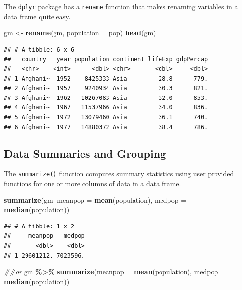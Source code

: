 \documentclass[
]{krantz}
\newenvironment{Shaded}{\begin{snugshade}}{\end{snugshade}}
\newcommand{\CommentTok}[1]{\textcolor[rgb]{0.56,0.35,0.01}{\textit{#1}}}
\newcommand{\DataTypeTok}[1]{\textcolor[rgb]{0.13,0.29,0.53}{#1}}
\newcommand{\KeywordTok}[1]{\textcolor[rgb]{0.13,0.29,0.53}{\textbf{#1}}}
\newcommand{\NormalTok}[1]{#1}
\newcommand{\OperatorTok}[1]{\textcolor[rgb]{0.81,0.36,0.00}{\textbf{#1}}}
\newcommand{\StringTok}[1]{\textcolor[rgb]{0.31,0.60,0.02}{#1}}
\begin{document}
The \texttt{dplyr} package has a \texttt{rename} function that makes renaming variables in a data frame quite easy.

\begin{Shaded}
\begin{Highlighting}[]
\NormalTok{gm \textless{}{-}}\StringTok{ }\KeywordTok{rename}\NormalTok{(gm, }\DataTypeTok{population =}\NormalTok{ pop)}
\KeywordTok{head}\NormalTok{(gm)}
\end{Highlighting}
\end{Shaded}

\begin{verbatim}
## # A tibble: 6 x 6
##   country   year population continent lifeExp gdpPercap
##   <chr>    <int>      <dbl> <chr>       <dbl>     <dbl>
## 1 Afghani~  1952    8425333 Asia         28.8      779.
## 2 Afghani~  1957    9240934 Asia         30.3      821.
## 3 Afghani~  1962   10267083 Asia         32.0      853.
## 4 Afghani~  1967   11537966 Asia         34.0      836.
## 5 Afghani~  1972   13079460 Asia         36.1      740.
## 6 Afghani~  1977   14880372 Asia         38.4      786.
\end{verbatim}

\hypertarget{data-summaries-and-grouping}{%
\subsection{Data Summaries and Grouping}\label{data-summaries-and-grouping}}

The \texttt{summarize()} function computes summary statistics using user provided functions for one or more columns of data in a data frame.

\begin{Shaded}
\begin{Highlighting}[]
\KeywordTok{summarize}\NormalTok{(gm, }\DataTypeTok{meanpop =} \KeywordTok{mean}\NormalTok{(population), }\DataTypeTok{medpop =} \KeywordTok{median}\NormalTok{(population))}
\end{Highlighting}
\end{Shaded}

\begin{verbatim}
## # A tibble: 1 x 2
##     meanpop   medpop
##       <dbl>    <dbl>
## 1 29601212. 7023596.
\end{verbatim}

\begin{Shaded}
\begin{Highlighting}[]
\CommentTok{\#\#or}
\NormalTok{gm }\OperatorTok{\%\textgreater{}\%}\StringTok{ }
\StringTok{  }\KeywordTok{summarize}\NormalTok{(}\DataTypeTok{meanpop =} \KeywordTok{mean}\NormalTok{(population), }\DataTypeTok{medpop =} \KeywordTok{median}\NormalTok{(population))}
\end{Highlighting}
\end{Shaded}
\end{document}
